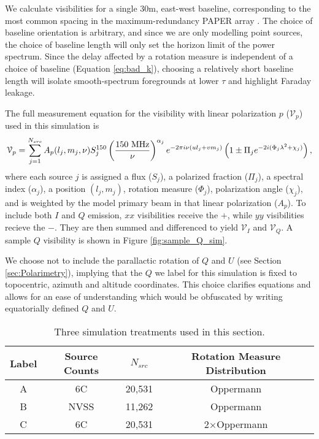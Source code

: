 We calculate visibilities for a single 30m, east-west baseline, corresponding to the most common spacing in
the maximum-redundancy PAPER array \cite{PAPERSensitivity, Parsons2014}. The choice of baseline
orientation is arbitrary, and since we are only modelling point sources, the choice of baseline
length will only set the horizon limit of the power spectrum. Since the delay affected by a rotation
measure is independent of a choice of baseline (Equation \ref{eq:bad_k}), choosing a relatively
short baseline length will isolate smooth-spectrum foregrounds at lower $\tau$ and highlight Faraday leakage.

The full measurement equation for the visibility with linear polarization $p$ ($\mathcal{V}_p$) used 
in this simulation is
\begin{align}
  \mathcal{V}_p = \sum_{j=1}^{N_{src}}
    A_p(l_j, m_j, \nu)
    S_j^{150}
    \left(\frac{150\ {\rm MHz}}{\nu}\right)^{\alpha_j}
    e^{ -2\pi i\nu(ul_j + vm_j)}
    \left(1 \pm \Pi_j e^{-2i(\Phi_j\lambda^2 + \chi_j)} \right),
    \label{eq:sim_vis}
\end{align}
where each source $j$ is assigned a flux ($S_j$), a polarized fraction ($\Pi_j$), a spectral index
($\alpha_j$), a position $(l_j,m_j)$, rotation measure ($\Phi_j$), polarization angle ($\chi_j$),
and is weighted by the model primary beam in that linear polarization ($A_p$). To include both $I$
and $Q$ emission, $xx$ visibilities receive the $+$, while $yy$ visibilities recieve the $-$. They
are then summed and differenced to yield $\mathcal{V}_I$ and $\mathcal{V}_Q$. A sample $Q$ visibility 
is shown in Figure \ref{fig:sample_Q_sim}.

We choose not to include the parallactic rotation of $Q$ and $U$ (see Section
\ref{sec:Polarimetry}), implying that the $Q$ we label for this simulation is fixed to topocentric,
azimuth and altitude coordinates. This choice clarifies equations and allows for an ease of
understanding which would be obfuscated by writing equatorially defined $Q$ and $U$.

\begin{table}
  \begin{center}
    \begin{tabular}{c c c c}
      {\bf Label} & {\bf Source Counts} & {\bf $N_{src}$} & {\bf Rotation Measure Distribution}\\ 
      \hline\hline
      A & 6C   & 20,531 & Oppermann \\
      B & NVSS & 11,262 & Oppermann \\
      C & 6C   & 20,531 & 2$\times$Oppermann \\
    \end{tabular}
  \end{center}
  \caption[Simulation treatments]{\label{tab:sims} Three simulation treatments used in this section.}
\end{table}


